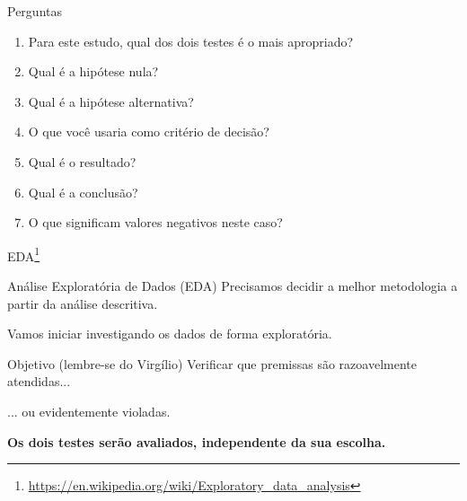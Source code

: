 \documentclass{beamer}
\begin{document}
\begin{frame}[label=perguntas]{Perguntas}
  \begin{enumerate}
  \item Para este estudo, qual dos dois testes é o mais apropriado?
  \item Qual é a hipótese nula?
  \item Qual é a hipótese alternativa?
  \item O que você usaria como critério de decisão?
  \item Qual é o resultado?
  \item Qual é a conclusão?
  \item O que significam valores negativos neste caso?
  \end{enumerate}
\end{frame}

\begin{frame}{EDA\footnote{\scriptsize \url{https://en.wikipedia.org/wiki/Exploratory_data_analysis}}}
  \begin{block}{Análise Exploratória de Dados (EDA)}
    \footnotesize
    Precisamos decidir a melhor metodologia a partir da análise descritiva.

    \bigskip
    Vamos iniciar investigando os dados de forma exploratória.
  \end{block}
  \vfill
  \begin{block}{Objetivo (lembre-se do Virgílio)}
    Verificar que premissas são razoavelmente atendidas...

    \bigskip
    ... ou evidentemente violadas.
  \end{block}
\end{frame}

\begin{frame}
  \begin{center}
    {\bf Os dois testes serão avaliados, independente da sua escolha.}
  \end{center}
  \vfill
\end{frame}
\end{document}
